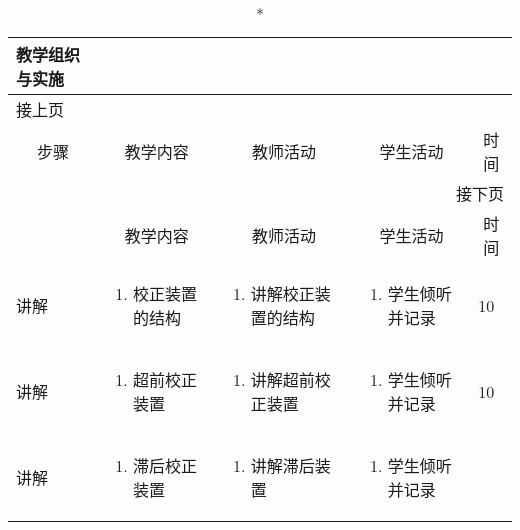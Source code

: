 {%
\begin{landscape}

\begin{longtable}{|m{10mm}|m{50mm}|m{50mm}|m{50mm}|m{15mm}|}
\caption*{\huge 教学组织与实施}\\
\hline
\endfirsthead
\multicolumn{5}{l}{\small 接上页}\\
\hline
\multicolumn{1}{|c|}{步骤}&\multicolumn{1}{c|}{教学内容}&\multicolumn{1}{c|}{教师活动}&\multicolumn{1}{c|}{学生活动}&\multicolumn{1}{c|}{时间}\\
\hline
\endhead

\multicolumn{5}{r}{\small 接下页}\\
\endfoot
\hline
\endlastfoot
\multicolumn{1}{|c|}{步骤}&\multicolumn{1}{c|}{教学内容}&\multicolumn{1}{c|}{教师活动}&\multicolumn{1}{c|}{学生活动}&\multicolumn{1}{c|}{时间}\\\hline
讲解&\begin{enumerate}
\item 校正装置的结构
\end{enumerate} &\begin{enumerate}
\item 讲解校正装置的结构
\end{enumerate} &\begin{enumerate}
\item 学生倾听并记录
\end{enumerate} &10 \\\hline
讲解&\begin{enumerate}
\item 超前校正装置
\end{enumerate}
 &\begin{enumerate}
\item 讲解超前校正装置
\end{enumerate} &\begin{enumerate}
\item 学生倾听并记录
\end{enumerate} &10 \\\hline
讲解&\begin{enumerate}
\item 滞后校正装置
\end{enumerate}
&\begin{enumerate}
\item 讲解滞后装置
\end{enumerate} &\begin{enumerate}
\item 学生倾听并记录

\end{enumerate}
\end{longtable}
\end{landscape}}
